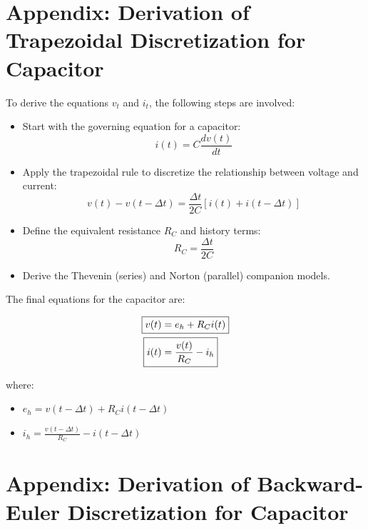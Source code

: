 \clearpage
\appendix
\renewcommand{\thesection}{\Roman{section}}
\section{Appendix: Derivation of Trapezoidal Discretization for Capacitor} \label{sec:appendix_cap_trapz}

To derive the equations \( v_{t} \) and \( i_{t} \), the following steps are involved:

\begin{itemize}
    \item Start with the governing equation for a capacitor:
    \begin{equation}
        i(t) = C \frac{dv(t)}{dt}
    \end{equation}
    \item Apply the trapezoidal rule to discretize the relationship between voltage and current:
    \begin{equation}
        v(t) - v(t - \Delta t) = \frac{\Delta t}{2C} \left[ i(t) + i(t - \Delta t) \right]
    \end{equation}
    \item Define the equivalent resistance \( R_C \) and history terms:
    \begin{equation}
        R_C = \frac{\Delta t}{2C}
    \end{equation}
    \item Derive the Thevenin (series) and Norton (parallel) companion models.
\end{itemize}

The final equations for the capacitor are:

\begin{align}
    \Aboxed{v(t) &= e_h + R_C i(t)} \label{eq:vt_cap_trapz_app} \\
    \Aboxed{i(t) &= \frac{v(t)}{R_C} - i_h} \label{eq:it_cap_trapz_app}
\end{align}

where:
\begin{itemize}
    \item \( e_h = v(t - \Delta t) + R_C i(t - \Delta t) \)
    \item \( i_h = \frac{v(t - \Delta t)}{R_C} - i(t - \Delta t) \)
\end{itemize}

\clearpage
\section{Appendix: Derivation of Backward-Euler Discretization for Capacitor} \label{sec:appendix_cap_be}

